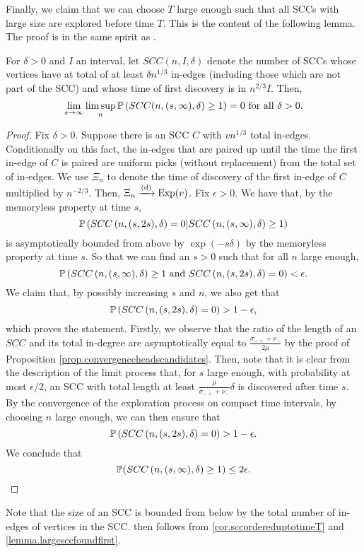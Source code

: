 Finally, we claim that we can choose $T$ large enough such that all SCCs with large size are explored before time $T$. This is the content of the following lemma. The proof is in the same spirit as \citet[Lemma 9]{aldous_1991}.
\begin{lemma}\label{lemma.largesccfoundfirst}
For $\delta>0$ and $I$ an interval, let $SCC(n,I,\delta)$ denote the number of SCCs whose vertices have at total of at least $\delta n^{1/3}$ in-edges (including those which are not part of the SCC) and whose time of first discovery is in $n^{2/3}I$. Then,
$$\lim_{s\to \infty}\limsup_{n} \P\left(SCC(n,(s,\infty),\delta)\geq 1\right)=0\text{ for all }\delta>0.$$
\end{lemma}
\begin{proof}
Fix $\delta>0$. Suppose there is an SCC $C$ with $vn^{1/3}$ total in-edges. Conditionally on this fact, the in-edges that are paired up until the time the first in-edge of $C$ is paired are uniform picks (without replacement) from the total set of in-edges. We use $\Xi_n$ to denote the time of discovery of the first in-edge of $C$ multiplied by $n^{-2/3}$. Then, $\Xi_n\todist\operatorname{Exp}(v)$. Fix $\epsilon>0$. We have that, by the memoryless property at time $s$,
$$\P\left(SCC\left(n,(s,2s),\delta\right)=0|SCC\left(n,(s,\infty),\delta\right)\geq 1\right)$$
is asymptotically bounded from above by 
$\exp(-s\delta)$ by the memoryless property at time $s$. So that we can find an $s>0$ such that for all $n$ large enough,
$$\P\left(SCC\left(n,(s,\infty),\delta\right)\geq 1 \text{ and }SCC\left(n,(s,2s),\delta\right)=0\right)<\epsilon.$$
We claim that, by possibly increasing $s$ and $n$, we also get that 
$$\P\left(SCC\left(n,(s,2s),\delta\right)=0\right)>1-\epsilon,$$
which proves the statement.
Firstly, we observe that the ratio of the length of an $SCC$ and its total in-degree are asymptotically equal to $\frac{\sigma_{-+}+\nu_-}{2\mu}$ by the proof of Proposition \ref{prop.convergenceheadscandidates}. Then, note that it is clear from the description of the limit process that, for $s$ large enough, with probability at most $\epsilon/2$, an SCC with total length at least $\frac{\mu}{\sigma_{-+}+\nu_-}\delta$ is discovered after time $s$. By the convergence of the exploration process on compact time intervals, by choosing $n$ large enough, we can then ensure that 
$$\P\left(SCC\left(n,(s,2s),\delta\right)=0\right)>1-\epsilon.$$
We conclude that 
\begin{equation*}
    \P(SCC\left(n,(s,\infty),\delta\right)\geq 1)\leq 2\epsilon. \qedhere
\end{equation*}
\end{proof}
Note that the size of an SCC is bounded from below by the total number of in-edges of vertices in the SCC.  then follows from \cref{cor.sccordereduptotimeT} and \cref{lemma.largesccfoundfirst}. 

